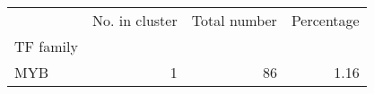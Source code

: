 \begin{tabular}{lrrr}
\toprule
{} &  No. in cluster &  Total number &  Percentage \\
TF family &                 &               &             \\
\midrule
MYB       &               1 &            86 &        1.16 \\
\bottomrule
\end{tabular}
